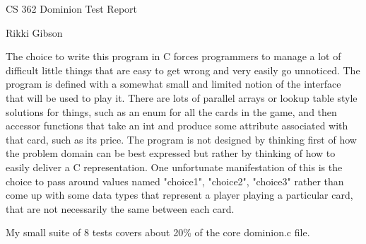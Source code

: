 \documentclass[11pt]{article}
\begin{document}
\Large CS 362 Dominion Test Report

\normalsize Rikki Gibson

\bigskip
The choice to write this program in C forces programmers to manage a lot of difficult little things that are easy to get wrong and very easily go unnoticed. The program is defined with a somewhat small and limited notion of the interface that will be used to play it. There are lots of parallel arrays or lookup table style solutions for things, such as an enum for all the cards in the game, and then accessor functions that take an int and produce some attribute associated with that card, such as its price. The program is not designed by thinking first of how the problem domain can be best expressed but rather by thinking of how to easily deliver a C representation. One unfortunate manifestation of this is the choice to pass around values named "choice1", "choice2", "choice3" rather than come up with some data types that represent a player playing a particular card, that are not necessarily the same between each card.

My small suite of 8 tests covers about 20\% of the core dominion.c file. 
\end{document}
